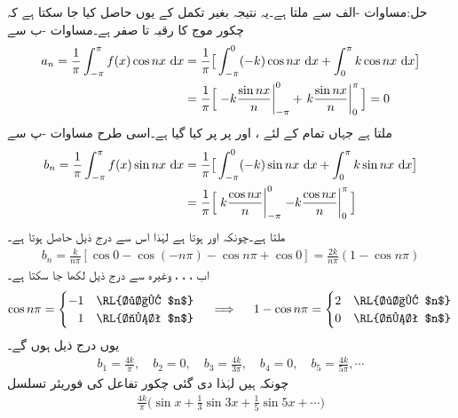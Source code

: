 حل:مساوات -الف سے  ملتا ہے۔یہ نتیجہ بغیر تکمل کے یوں حاصل کیا جا سکتا ہے کہ چکور موج کا رقبہ  تا  صفر ہے۔مساوات -ب سے
\begin{align*}
a_n=\frac{1}{\pi}\int_{-\pi}^{\pi}f(x)\cos nx\, \dif x&=\frac{1}{\pi}\big[\int_{-\pi}^{0}(-k)\cos nx\,\dif x+\int_{0}^{\pi}k\cos nx\,\dif x\big]\\
&=\frac{1}{\pi}\Big[\left. -k\frac{\sin nx}{n}\right|_{-\pi}^{0}+\left. k\frac{\sin nx}{n}\right|_{0}^{\pi}\Big]=0
\end{align*}
ملتا ہے جہاں تمام  کے لئے ،  اور  پر   پر کیا گیا ہے۔اسی طرح مساوات -پ سے
\begin{align*}
b_n=\frac{1}{\pi}\int_{-\pi}^{\pi}f(x)\sin nx\, \dif x&=\frac{1}{\pi}\big[\int_{-\pi}^{0}(-k)\sin nx\,\dif x+\int_{0}^{\pi}k\sin nx\,\dif x\big]\\
&=\frac{1}{\pi}\Big[\left. k\frac{\cos nx}{n}\right|_{-\pi}^{0}\left. -k\frac{\cos nx}{n}\right|_{0}^{\pi}\Big]
\end{align*}
ملتا ہے۔چونکہ  اور  ہوتا ہے لہٰذا اس سے درج ذیل حاصل ہوتا ہے۔
\begin{align*}
b_n=\frac{k}{n\pi}[\cos 0-\cos(-n\pi)-\cos n\pi +\cos 0]=\frac{2k}{n\pi}(1-\cos n\pi)
\end{align*}
اب ، ، ، وغیرہ سے درج ذیل لکھا جا سکتا ہے۔
\begin{align*}
\cos n\pi=
\begin{cases}
-1& \text{\RL{طاق $n$}}\\
\phantom{-}1&\text{\RL{جفت $n$}}
\end{cases}
\quad \implies \quad
1-\cos n\pi=
\begin{cases}
2&\text{\RL{طاق $n$}}\\
0&\text{\RL{جفت $n$}}
\end{cases}
\end{align*}
یوں  درج ذیل ہوں گے۔
\begin{align*}
b_1=\frac{4k}{\pi},\quad  b_2=0,\quad  b_3=\frac{4k}{3\pi},\quad b_4=0,\quad  b_5=\frac{4k}{5\pi}, \cdots
\end{align*}
چونکہ  ہیں لہٰذا دی گئی چکور تفاعل کی فوریئر تسلسل
\begin{align}
\frac{4k}{\pi}\big(\sin x+\frac{1}{3}\sin 3x+\frac{1}{5}\sin 5x+\cdots \big)
\end{align}
